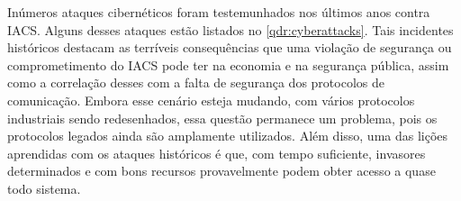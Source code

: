         Inúmeros ataques cibernéticos foram testemunhados nos últimos anos contra IACS. Alguns desses ataques estão listados no \autoref{qdr:cyberattacks}. Tais incidentes históricos destacam as terríveis consequências que uma violação de segurança ou comprometimento do IACS pode ter na economia e na segurança pública, assim como a correlação desses com a falta de segurança dos protocolos de comunicação. Embora esse cenário esteja mudando, com vários protocolos industriais sendo redesenhados, essa questão permanece um problema, pois os protocolos legados ainda são amplamente utilizados. Além disso, uma das lições aprendidas com os ataques históricos é que, com tempo suficiente, invasores determinados e com bons recursos provavelmente podem obter acesso a quase todo sistema.
        
